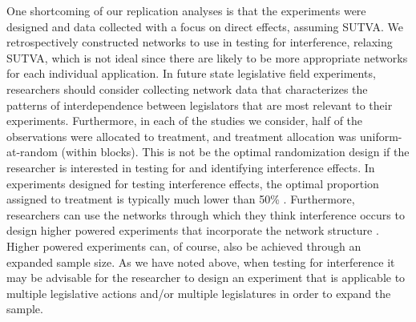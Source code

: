 \documentclass[12pt]{article}
\begin{document}
One shortcoming of our replication analyses is that the experiments were designed and data collected with a focus on direct effects, assuming SUTVA. We retrospectively constructed networks to use in testing for interference, relaxing SUTVA, which is not ideal since there are likely to be more appropriate networks for each individual application. In future state legislative field experiments, researchers should consider collecting network data that characterizes the patterns of interdependence between legislators that are most relevant to their experiments. Furthermore, in each of the studies we consider, half of the observations were allocated to treatment, and treatment allocation was uniform-at-random (within blocks). This is not be the optimal randomization design if the researcher is interested in testing for and identifying interference effects. In experiments designed for testing interference effects, the optimal proportion assigned to treatment is typically much lower than 50\% \citep{bowers2016models}. Furthermore, researchers can use the networks through which they think interference occurs to design higher powered experiments that incorporate the network structure \citep{bowers2016models}.  Higher powered experiments can, of course, also be achieved through an expanded sample size. As we have noted above, when testing for interference it may be advisable for the researcher to design an experiment that is applicable to multiple legislative actions and/or multiple legislatures in order to expand the sample.



\end{document}
